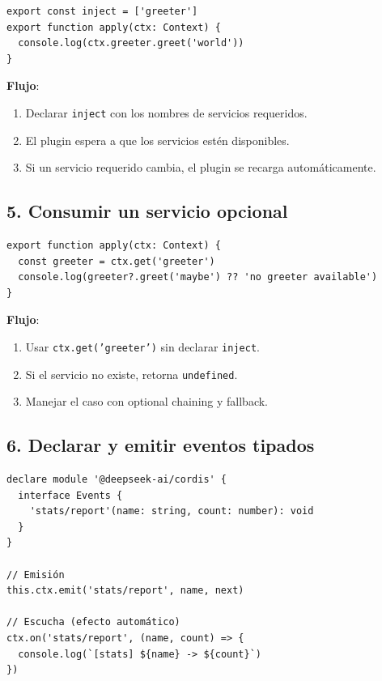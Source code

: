 \documentclass[11pt,a4paper]{article}
\begin{document}
\begin{lstlisting}
export const inject = ['greeter']
export function apply(ctx: Context) {
  console.log(ctx.greeter.greet('world'))
}
\end{lstlisting}


\textbf{Flujo}:


\begin{enumerate}[leftmargin=*,topsep=2pt,itemsep=1pt]
  \item Declarar \texttt{inject} con los nombres de servicios requeridos.
  \item El plugin espera a que los servicios estén disponibles.
  \item Si un servicio requerido cambia, el plugin se recarga automáticamente.
\end{enumerate}


\subsection*{5. Consumir un servicio opcional}


\begin{lstlisting}
export function apply(ctx: Context) {
  const greeter = ctx.get('greeter')
  console.log(greeter?.greet('maybe') ?? 'no greeter available')
}
\end{lstlisting}


\textbf{Flujo}:


\begin{enumerate}[leftmargin=*,topsep=2pt,itemsep=1pt]
  \item Usar \texttt{ctx.get('greeter')} sin declarar \texttt{inject}.
  \item Si el servicio no existe, retorna \texttt{undefined}.
  \item Manejar el caso con optional chaining y fallback.
\end{enumerate}


\subsection*{6. Declarar y emitir eventos tipados}


\begin{lstlisting}
declare module '@deepseek-ai/cordis' {
  interface Events {
    'stats/report'(name: string, count: number): void
  }
}

// Emisión
this.ctx.emit('stats/report', name, next)

// Escucha (efecto automático)
ctx.on('stats/report', (name, count) => {
  console.log(`[stats] ${name} -> ${count}`)
})
\end{lstlisting}
\end{document}
